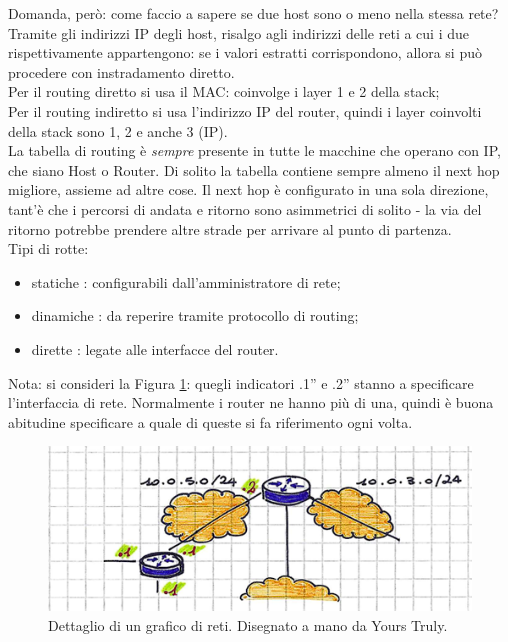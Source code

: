 \noindent Domanda, però: come faccio a sapere se due host sono o meno nella stessa rete?\\
Tramite gli indirizzi IP degli host, risalgo agli indirizzi delle reti a cui i due rispettivamente appartengono: se i valori estratti corrispondono, allora si può procedere con instradamento diretto.\\

\noindent Per il routing diretto si usa il MAC: coinvolge i layer 1 e 2 della stack;\\Per il routing indiretto si usa l'indirizzo IP del router, quindi i layer coinvolti della stack sono 1, 2 e anche 3 (IP).\\

\noindent La tabella di routing è \textit{sempre} presente in tutte le macchine che operano con IP, che siano Host o Router. Di solito la tabella contiene sempre almeno il next hop migliore, assieme ad altre cose. Il next hop è configurato in una sola direzione, tant'è che i percorsi di andata e ritorno sono asimmetrici di solito - la via del ritorno potrebbe prendere altre strade per arrivare al punto di partenza.\\

\noindent Tipi di rotte:
\begin{itemize}
    \item statiche : configurabili dall'amministratore di rete;
    \item dinamiche : da reperire tramite protocollo di routing;
    \item dirette : legate alle interfacce del router.
\end{itemize}

\noindent Nota: si consideri la Figura \ref{fig:05interface}: quegli indicatori \openapex .1'' e \openapex.2'' stanno a specificare l'interfaccia di rete. Normalmente i router ne hanno più di una, quindi è buona abitudine specificare a quale di queste si fa riferimento ogni volta.

\begin{figure} [h]
    \centering
    \includegraphics[width=0.8\linewidth]{Figures//05/interfacce.png}
    \caption{Dettaglio di un grafico di reti. Disegnato a mano da Yours Truly.}
    \label{fig:05interface}
\end{figure}

